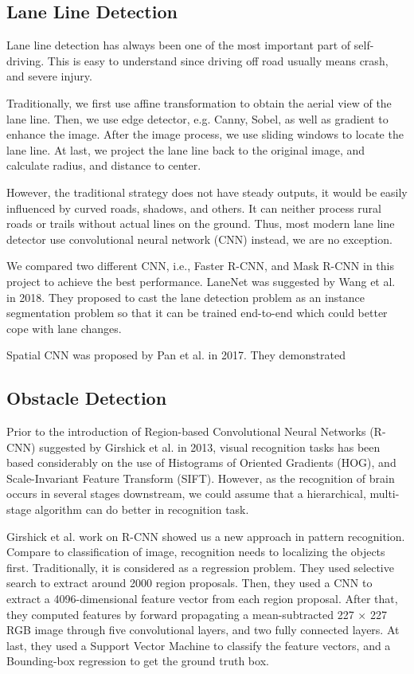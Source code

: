 \documentclass[runningheads]{llncs}
\begin{document}
\subsection{Lane Line Detection}
Lane line detection has always been one of the most 
important part of self-driving. This is easy to understand 
since driving off road usually means crash, and severe 
injury. 

Traditionally, we first use affine transformation to obtain 
the aerial view of the lane line. Then, we use edge 
detector, e.g. Canny, Sobel, as well as gradient to enhance 
the image. After the image process, we use sliding windows 
to locate the lane line. At last, we project the lane line 
back to the original image, and calculate radius, and 
distance to center. 

However, the traditional strategy does not have steady 
outputs, it would be easily influenced by curved roads, 
shadows, and others. It can neither process rural roads or 
trails without actual lines on the ground. Thus, most 
modern lane line detector use convolutional neural network 
(CNN) instead, we are no exception. 

We compared two different CNN, i.e., Faster R-CNN, and 
Mask R-CNN in this project to achieve the 
best performance. 
LaneNet was suggested by Wang et al.\cite{LaneNet} in 2018. 
They proposed to cast the lane detection problem as an 
instance segmentation problem so that it can be trained 
end-to-end which could better cope with lane changes.

Spatial CNN was proposed by Pan et al.\cite{SpatialCNN} 
in 2017. They demonstrated

\subsection{Obstacle Detection}
Prior to the introduction of Region-based Convolutional 
Neural Networks (R-CNN) suggested by Girshick et al. 
\cite{RCNN} in 2013, visual recognition tasks has been 
based considerably on the use of Histograms of Oriented 
Gradients (HOG)\cite{HOG}, and Scale-Invariant Feature 
Transform (SIFT)\cite{SIFT}. However, as the recognition of 
brain occurs in several stages downstream, we could assume 
that a hierarchical, multi-stage algorithm can do better in 
recognition task. 

Girshick et al. work on R-CNN showed us a new approach in 
pattern recognition. Compare to classification of image, 
recognition needs to localizing the objects first. 
Traditionally, it is considered as a regression problem. 
They used selective search to extract around 2000 region 
proposals. Then, they used a CNN to extract a 
4096-dimensional feature vector from each region proposal. 
After that, they computed features by forward propagating
a mean-subtracted 227 × 227 RGB image through five 
convolutional layers, and two fully connected layers. At 
last, they used a Support Vector Machine to classify the 
feature vectors, and a Bounding-box regression to get the 
ground truth box. 
\end{document}
